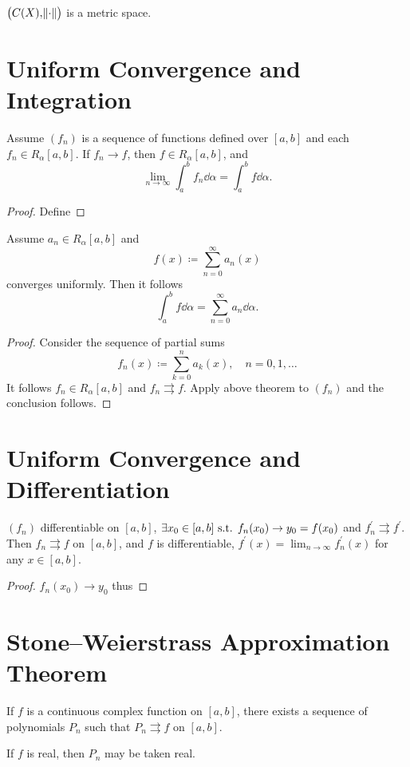 \begin{proposition}
$\left(C(X),\norm{\cdot}\right)$ is a metric space.
\end{proposition}

\section{Uniform Convergence and Integration}
\begin{theorem}
Assume $(f_n)$ is a sequence of functions defined over $[a,b]$ and each $f_n\in R_\alpha[a,b]$. If $f_n\to f$, then $f\in R_\alpha[a,b]$, and
\[ \lim_{n\to\infty}\int_a^bf_n\dd{\alpha}=\int_a^bf\dd{\alpha}. \]
\end{theorem}

\begin{proof}
Define
\end{proof}

\begin{corollary}
Assume $a_n\in R_\alpha[a,b]$ and
\[ f(x)\coloneqq\sum_{n=0}^\infty a_n(x) \]
converges uniformly. Then it follows
\[ \int_a^bf\dd{\alpha}=\sum_{n=0}^\infty a_n\dd{\alpha}. \]
\end{corollary}

\begin{proof}
Consider the sequence of partial sums 
\[ f_n(x)\coloneqq\sum_{k=0}^na_k(x), \quad n=0,1,\dots \]
It follows $f_n\in R_\alpha[a,b]$ and $f_n\rightrightarrows f$. Apply above theorem to $(f_n)$ and the conclusion follows.
\end{proof}

\section{Uniform Convergence and Differentiation}
\begin{theorem}
$(f_n)$ differentiable on $[a,b]$, $\exists x_0\in[a,b]\text{ s.t. } f_n(x_0)\to y_0=f(x_0)$ and $f_n^\prime\rightrightarrows f^\prime$. Then $f_n\rightrightarrows f$ on $[a,b]$, and $f$ is differentiable, $f^\prime(x)=\lim_{n\to\infty}f_n^\prime(x)$ for any $x\in[a,b]$.
\end{theorem}

\begin{proof}
$f_n(x_0)\to y_0$ thus
\end{proof}

\section{Stone--Weierstrass Approximation Theorem}
\begin{theorem}
If $f$ is a continuous complex function on $[a,b]$, there exists a sequence of polynomials $P_n$ such that $P_n\rightrightarrows f$ on $[a,b]$.

If $f$ is real, then $P_n$ may be taken real.
\end{theorem}